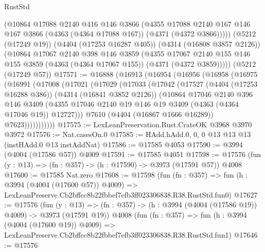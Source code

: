 \begin{lexlean}{RustStd}
\begin{coremodule}
        (@10864
          @17088
          @2140
          @416
          @146
          @3866
          (@4355
            @17088
            @2140
            @167
            @146
            @167
            @3866
            (@4363 (@4364 @17088 @167))
            (@4371 (@4372 @3866)))))
      (@5212 (@17249 @19))
      (@4404 (@17253 @16287 @405))
      (@4314 (@16808 @3857 @2126))
      (@10864
        @17067
        @2140
        @398
        @146
        @3859
        (@4355
          @17067
          @2140
          @155
          @146
          @155
          @3859
          (@4363 (@4364 @17067 @155))
          (@4371 (@4372 @3859)))))
    (@5212 (@17249 @57))
@17571 := @16888
    (@16913
      (@16954
        (@16956
          (@16958
            (@16975
              (@16991
                (@17008
                  (@17021
                    (@17029
                      (@17033
                        (@17042
                          (@17527
                            (@4404 (@17253 @16288 @386))
                            (@4314 (@16841 @3852 @2126))
                            (@10864
                              @17046
                              @2140
                              @396
                              @146
                              @3409
                              (@4355
                                @17046
                                @2140
                                @19
                                @146
                                @19
                                @3409
                                (@4363 (@4364 @17046 @19))
                                @12727)))
                          @7610
                          (@4404 (@16867 @1666 @16289))
                          @7623)))))))))))
@17575 := LexLeanPreservation.Rust.CrateOK @3968 @3970 @3972
@17576 := Nat.casesOn.{0}
@17585 := HAdd.hAdd.{0, 0, 0} @13 @13 @13 (instHAdd.{0} @13 instAddNat)
@17586 := @17585 @4053
@17590 := @3994 (@4004 (@17586 @57)) @4009
@17591 := @17585 @4051
@17598 := @17576 (fun (y : @13) => (fn : @357) -> (h : @17590) -> @3973 (@17591 @57)) @4008
@17600 := @17585 Nat.zero
@17608 := @17598
    (fun (fn : @357) =>
    fun (h : @3994 (@4004 (@17600 @57)) @4009) =>
    LexLeanPreserve.Cb2bffcc8b22fbbef7efb3ff023306838.R38.RustStd.fun0)
@17627 := @17576
    (fun (y : @13) => (fn : @357) -> (h : @3994 (@4004 (@17586 @19)) @4009) -> @3973 (@17591 @19))
    @4008
    (fun (fn : @357) =>
    fun (h : @3994 (@4004 (@17600 @19)) @4009) =>
    LexLeanPreserve.Cb2bffcc8b22fbbef7efb3ff023306838.R38.RustStd.fun1)
@17646 := @17576

\end{coremodule}
\end{lexlean}
